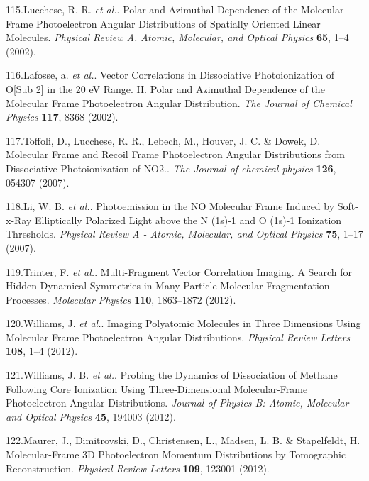 \documentclass[10pt]{article}
\begin{document}
\label{csl:115}115.Lucchese, R. R. \textit{et al.}. {Polar and Azimuthal Dependence of the Molecular Frame Photoelectron Angular Distributions of Spatially Oriented Linear Molecules}. \textit{Physical Review A. Atomic, Molecular, and Optical Physics} \textbf{65}, 1–4 (2002).

\label{csl:116}116.Lafosse, a. \textit{et al.}. {Vector Correlations in Dissociative Photoionization of {{O}}[Sub 2] in the 20 {{eV}} Range. {{II}}. {{Polar}} and Azimuthal Dependence of the Molecular Frame Photoelectron Angular Distribution}. \textit{The Journal of Chemical Physics} \textbf{117}, 8368 (2002).

\label{csl:117}117.Toffoli, D., Lucchese, R. R., Lebech, M., Houver, J. C. \& Dowek, D. {Molecular Frame and Recoil Frame Photoelectron Angular Distributions from Dissociative Photoionization of {{NO2}}.}. \textit{The Journal of chemical physics} \textbf{126}, 054307 (2007).

\label{csl:118}118.Li, W. B. \textit{et al.}. {Photoemission in the {{NO}} Molecular Frame Induced by Soft-x-Ray Elliptically Polarized Light above the {{N}} (1s)-1 and {{O}} (1s)-1 Ionization Thresholds}. \textit{Physical Review A - Atomic, Molecular, and Optical Physics} \textbf{75}, 1–17 (2007).

\label{csl:119}119.Trinter, F. \textit{et al.}. {Multi-Fragment Vector Correlation Imaging. {{A}} Search for Hidden Dynamical Symmetries in Many-Particle Molecular Fragmentation Processes}. \textit{Molecular Physics} \textbf{110}, 1863–1872 (2012).

\label{csl:120}120.Williams, J. \textit{et al.}. {Imaging {{Polyatomic Molecules}} in {{Three Dimensions Using Molecular Frame Photoelectron Angular Distributions}}}. \textit{Physical Review Letters} \textbf{108}, 1–4 (2012).

\label{csl:121}121.Williams, J. B. \textit{et al.}. {Probing the Dynamics of Dissociation of Methane Following Core Ionization Using Three-Dimensional Molecular-Frame Photoelectron Angular Distributions}. \textit{Journal of Physics B: Atomic, Molecular and Optical Physics} \textbf{45}, 194003 (2012).

\label{csl:122}122.Maurer, J., Dimitrovski, D., Christensen, L., Madsen, L. B. \& Stapelfeldt, H. {Molecular-{{Frame 3D Photoelectron Momentum Distributions}} by {{Tomographic Reconstruction}}}. \textit{Physical Review Letters} \textbf{109}, 123001 (2012).
\end{document}
